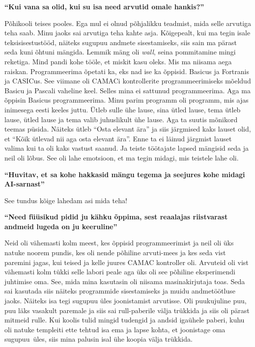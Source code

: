\textbf{\enquote{Kui vana sa olid, kui su isa need arvutid omale hankis?}}

Põhikooli teises pooles. Ega mul ei olnud põhjalikku teadmist, mida selle arvutiga teha saab. Minu jaoks sai arvutiga teha kahte asja. Kõigepealt, kui ma tegin isale teksisisestustööd, näiteks sugupuu andmete sisestamiseks, siis sain ma pärast seda kuni õhtuni mängida. Lemmik mäng oli \emph{wall}, seina pommitamine mingi reketiga. Mind pandi kohe tööle, et miskit kasu oleks. Mis ma niisama aega raiskan. Programmeerima õpetati ka, eks nad ise ka õppisid. Basicus ja Fortranis ja CASICus. See viimane oli CAMACi kontrollerite programmeerimiseks mõeldud Basicu ja Pascali vaheline keel. Selles mina ei sattunud programmeerima. Aga ma õppisin Basicus programmeerima. Minu parim programm oli programm, mis ajas inimesega eesti keeles juttu. Ütleb sulle ühe lause, sina ütled lause, tema ütleb lause, ütled lause ja tema valib juhuslikult ühe lause. Aga ta suutis mõnikord teemas püsida. Näiteks ütleb \enquote{Osta elevant ära} ja siis järgmised kaks lauset olid, et \enquote{Kõik ütlevad nii aga osta elevant ära}. Enne ta ei läinud järgmist lauset valima kui ta oli kaks vastust saanud. Ja teiste töötajate lapsed mängisid seda ja neil oli lõbus. See oli lahe emotsioon, et ma tegin midagi, mis teistele lahe oli. 

\textbf{\enquote{Huvitav, et sa kohe hakkasid mängu tegema ja seejures kohe midagi AI-sarnast}}

See tundus kõige lahedam asi mida teha! 

\textbf{\enquote{Need füüsikud pidid ju kähku õppima, sest reaalajas riistvarast andmeid lugeda on ju keeruline}}

Neid oli vähemasti kolm meest, kes õppisid programmeerimist ja neil oli üks natuke noorem pundis, kes oli nende põhiline arvuti-mees ja kes seda vist paremini jagas, kui teised ja kelle juures CAMAC kontroller oli. Arvuteid oli vist vähemasti kolm tükki selle labori peale aga üks oli see põhiline eksperimendi juhtimise oma. See, mida mina kasutasin oli niisama masinakirjutaja toas. Seda sai kasutada siis näiteks programmide sisestamiseks ja muidu andmetöötluse jaoks. Näiteks isa tegi sugupuu üles joonistamist arvutisse. Oli puukujuline puu, puu läks vasakult paremale ja siis sai rull-paberile välja trükkida ja siis oli pärast mitmeid rulle. Kui koolis tulid mingid tudengid ja andsid igaühele paberi, kuhu oli natuke templeiti ette tehtud isa ema ja lapse kohta, et joonistage oma sugupuu üles, siis mina palusin isal ühe koopia välja trükkida. 

